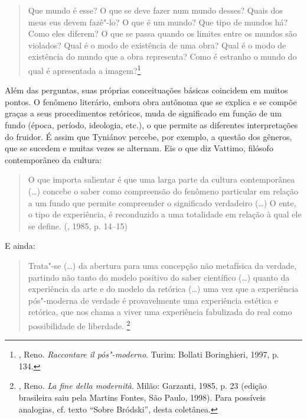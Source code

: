 {\begin{quote}
Que mundo é esse? O que se deve fazer num mundo desses? Quais dos meus
eus devem fazê"-lo? O que é um mundo? Que tipo de mundos há? Como eles
diferem? O que se passa quando os limites entre os mundos são violados?
Qual é o modo de existência de uma obra? Qual é o modo de existência do
mundo que a obra representa? Como é estranho o mundo do qual é
apresentada a imagem?\footnote{, Reno. 
\emph{Raccontare il pós"-moderno}. Turim: Bollati Boringhieri, 1997,
 p. 134.}
\end{quote}

Além das perguntas, suas próprias conceituações básicas coincidem em
muitos pontos. O fenômeno literário, embora obra autônoma que se explica
e se compõe graças a seus procedimentos retóricos, muda de
significado em função de um fundo (época, período, ideologia, etc.), o
que permite as diferentes interpretações do fruidor. É assim que
Tyniánov percebe, por exemplo, a questão dos gêneros, que se sucedem e muitas
vezes se alternam. Eis o que diz Vattimo, filósofo contemporâneo da cultura:

\begin{quote}
O que importa salientar é que uma larga parte da cultura contemporânea
(\ldots{}) concebe o saber como compreensão do fenômeno particular em
relação a um fundo que permite compreender o significado verdadeiro
(\ldots{}) O ente, o tipo de experiência, é reconduzido a uma
totalidade em relação à qual ele se define. (, 1985, p. 14--15)
\end{quote}

E ainda:

\begin{quote}
Trata"-se (\ldots{}) da abertura para uma concepção não metafísica da
verdade, partindo não tanto do modelo positivo do saber científico
(\ldots{}) quanto da experiência da arte e do modelo da retórica (\ldots{}) uma vez que a experiência pós"-moderna de verdade é
provavelmente uma experiência estética e retórica, que nos chama a viver
uma experiência fabulizada do real como possibilidade de liberdade.
\footnote{, Reno. \emph{La fine della modernità}. Milão:
 Garzanti, 1985, p. 23 (edição brasileira saiu pela Martins Fontes,
 São Paulo, 1998). Para possíveis analogias, cf. texto ``Sobre
 Bródski'', desta coletânea.}
\end{quote}

}
